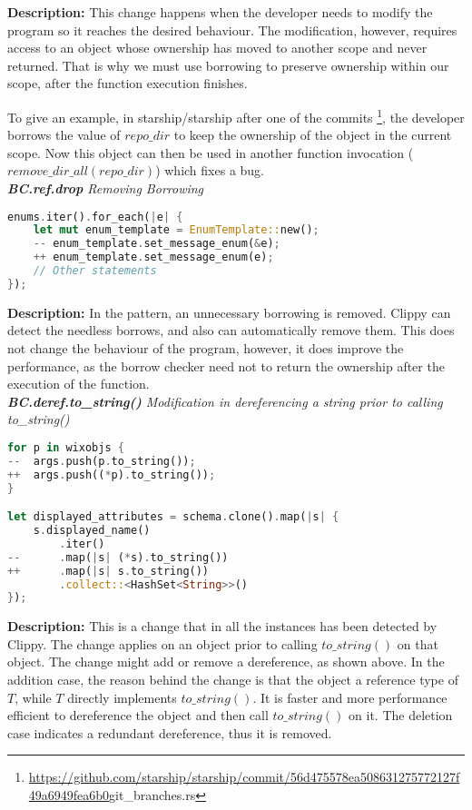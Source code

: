 \noindent \textbf{Description:} This change happens when the developer needs to modify the program so it reaches the desired behaviour. The modification, however, requires access to an object whose ownership has moved to another scope and never returned. That is why we must use borrowing to preserve ownership within our scope, after the function execution finishes.

To give an example, in starship/starship after one of the commits \footnote{\url{https://github.com/starship/starship/commit/56d475578ea508631275772127f49a6949fea6b0}{git\_branches.rs}}, the developer borrows the value of $repo\_dir$ to keep the ownership of the object in the current scope. Now this object can then be used in another function invocation ($remove\_dir\_all(repo\_dir)$) which fixes a bug. \\

\noindent \textit{ \textbf{BC.ref.drop} Removing Borrowing}

\begin{lstlisting}[language=Rust, style=colouredRust]
enums.iter().for_each(|e| {
    let mut enum_template = EnumTemplate::new();
    -- enum_template.set_message_enum(&e);
    ++ enum_template.set_message_enum(e);
    // Other statements
});
\end{lstlisting}

\noindent \textbf{Description:} In the pattern, an unnecessary borrowing is removed. Clippy can detect the needless borrows, and also can automatically remove them. This does not change the behaviour of the program, however, it does improve the performance, as the borrow checker need not to return the ownership after the execution of the function. \\


\noindent \textit{ \textbf{BC.deref.to\_string()} Modification in dereferencing a string prior to calling to\_string()}

\begin{lstlisting}[language=Rust, style=colouredRust]
for p in wixobjs {
--  args.push(p.to_string());
++  args.push((*p).to_string());
}

let displayed_attributes = schema.clone().map(|s| {
    s.displayed_name()
        .iter()
--      .map(|s| (*s).to_string())
++      .map(|s| s.to_string())
        .collect::<HashSet<String>>()
});
\end{lstlisting}

\noindent \textbf{Description:} This is a change that in all the instances has been detected by Clippy. The change applies on an object prior to calling $to\_string()$ on that object. The change might add or remove a dereference, as shown above. In the addition case, the reason behind the change is that the object a reference type of $T$, while $T$ directly implements $to\_string()$. It is faster and more performance efficient to dereference the object and then call $to\_string()$ on it. The deletion case indicates a redundant dereference, thus it is removed.


